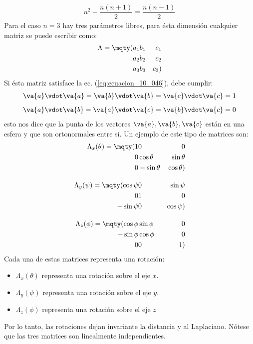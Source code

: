 \begin{align*}
n^{2} - \dfrac{n (n+1)}{2} = \dfrac{n (n-1)}{2}
\end{align*}
Para el caso $n = 3$ hay tres parámetros libres, para ésta dimensión cualquier matriz se puede escribir como:
\begin{align}
\Lambda = \mqty(a_{1} & b_{1} & c_{1} \\ a_{2} & b_{2} & c_{2} \\ a_{3} & b_{3} & c_{3})
\label{eq:ecuacion_10_048}
\end{align}
Si ésta matriz satisface la ec. (\ref{eq:ecuacion_10_046}), debe cumplir:
\begin{align}
\begin{aligned}
\va{a} \vdot \va{a} = \va{b} \vdot \va{b} = \va{c} \vdot \va{c} =  1 \\[0.5em]
\va{a} \vdot \va{b} = \va{a} \vdot \va{c} = \va{b} \vdot \va{c} =  0
\end{aligned}
\label{eq:ecuacion_10_049}
\end{align}
esto nos dice que la punta de los vectores $\va{a}, \va{b},\va{c}$ están en una esfera y que son ortonormales entre sí. Un ejemplo de este tipo de matrices son:
\begin{align}
\Lambda_{x} (\theta) = \mqty(1 & 0 & 0 \\ 0 & \cos \theta & \sin \theta \\ 0 & -\sin \theta & \cos \theta) \label{eq:ecuacion_10_050} \\[1em]
\Lambda_{y} (\psi) = \mqty(\cos \psi & 0 & \sin \psi \\ 0 & 1 & 0 \\ - \sin \psi & 0 & \cos \psi) \label{eq:ecuacion_10_051} \\[1em]
\Lambda_{z} (\phi) = \mqty(\cos \phi & \sin \phi & 0 \\ - \sin \phi & \cos \phi & 0 \\ 0 & 0 & 1) \label{eq:ecuacion_10_052}
\end{align}
Cada una de estas matrices representa una rotación:
\begin{itemize}
\item $\Lambda_{x} (\theta)$ representa una rotación sobre el eje $x$.
\item $\Lambda_{y} (\psi)$ representa una rotación sobre el eje $y$.
\item $\Lambda_{z} (\phi)$ representa una rotación sobre el eje $z$
\end{itemize}
Por lo tanto, las rotaciones dejan invariante la distancia y al Laplaciano. Nótese que las tres matrices son linealmente independientes.

